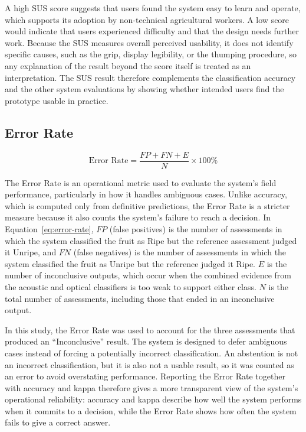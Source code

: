 \begin{thesisprose}
A high SUS score suggests that users found the system easy to learn and operate, which supports its adoption by non-technical agricultural workers. A low score would indicate that users experienced difficulty and that the design needs further work. Because the SUS measures overall perceived usability, it does not identify specific causes, such as the grip, display legibility, or the thumping procedure, so any explanation of the result beyond the score itself is treated as an interpretation. The SUS result therefore complements the classification accuracy and the other system evaluations by showing whether intended users find the prototype usable in practice.

\subsection{Error Rate}
\label{sec:error-rate-retrial}

\begin{equation}
\text{Error Rate} = \frac{FP + FN + E}{N} \times 100\%
\label{eq:error-rate}
\end{equation}

The Error Rate is an operational metric used to evaluate the system's field performance, particularly in how it handles ambiguous cases. Unlike accuracy, which is computed only from definitive predictions, the Error Rate is a stricter measure because it also counts the system's failure to reach a decision. In Equation~\eqref{eq:error-rate}, $FP$ (false positives) is the number of assessments in which the system classified the fruit as Ripe but the reference assessment judged it Unripe, and $FN$ (false negatives) is the number of assessments in which the system classified the fruit as Unripe but the reference judged it Ripe. $E$ is the number of inconclusive outputs, which occur when the combined evidence from the acoustic and optical classifiers is too weak to support either class. $N$ is the total number of assessments, including those that ended in an inconclusive output.

In this study, the Error Rate was used to account for the three assessments that produced an ``Inconclusive'' result. The system is designed to defer ambiguous cases instead of forcing a potentially incorrect classification. An abstention is not an incorrect classification, but it is also not a usable result, so it was counted as an error to avoid overstating performance. Reporting the Error Rate together with accuracy and kappa therefore gives a more transparent view of the system's operational reliability: accuracy and kappa describe how well the system performs when it commits to a decision, while the Error Rate shows how often the system fails to give a correct answer.


\end{thesisprose}
